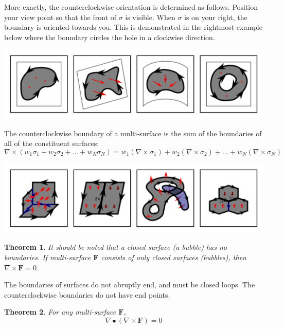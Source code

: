 \documentclass{book}
\newtheorem{thm}{Theorem}
\begin{document}
More exactly, the counterclockwise orientation is determined as follows. Position your view point so that the front of \(\sigma\) is visible. When \(\sigma\) is on your right, the boundary is oriented towards you. This is demonstrated in the rightmost example below where the boundary circles the hole in a clockwise direction.

\begin{center}
\includegraphics[width = \textwidth]{Boundaries/Surface_boundaries/surface_boundary_examples}
\end{center}

The counterclockwise boundary of a multi-surface is the sum of the boundaries of all of the constituent surfaces:
\[\nabla \times (w_1 \sigma_1 + w_2 \sigma_2 + ... + w_N \sigma_N)
= w_1(\nabla \times \sigma_1) + w_2(\nabla \times \sigma_2) + ... + w_N(\nabla \times \sigma_N)\]

\begin{center}
\includegraphics[width = \textwidth]{Boundaries/Surface_boundaries/surface_boundary_examples_2}
\end{center}

\begin{thm}
It should be noted that a closed surface (a bubble) has no boundaries. If multi-surface \(\mathbf{F}\) consists of only closed surfaces (bubbles), then \(\nabla \times \mathbf{F} = 0\). 
\end{thm}

The boundaries of surfaces do not abruptly end, and must be closed loops. The counterclockwise boundaries do not have end points. 
\begin{thm}
For any multi-surface \(\mathbf{F}\), 
\[\nabla \bullet (\nabla \times \mathbf{F}) = 0\]
\end{thm}
\end{document}
